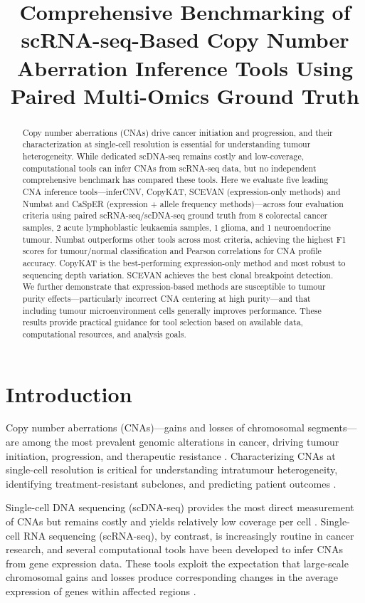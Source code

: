 \documentclass[11pt]{article}
\title{Comprehensive Benchmarking of scRNA-seq-Based Copy Number Aberration Inference Tools Using Paired Multi-Omics Ground Truth}
\author{}
\date{}
\begin{document}
\maketitle

\begin{abstract}
Copy number aberrations (CNAs) drive cancer initiation and progression, and their characterization at single-cell resolution is essential for understanding tumour heterogeneity. While dedicated scDNA-seq remains costly and low-coverage, computational tools can infer CNAs from scRNA-seq data, but no independent comprehensive benchmark has compared these tools. Here we evaluate five leading CNA inference tools---inferCNV, CopyKAT, SCEVAN (expression-only methods) and Numbat and CaSpER (expression + allele frequency methods)---across four evaluation criteria using paired scRNA-seq/scDNA-seq ground truth from 8 colorectal cancer samples, 2 acute lymphoblastic leukaemia samples, 1 glioma, and 1 neuroendocrine tumour. Numbat outperforms other tools across most criteria, achieving the highest F1 scores for tumour/normal classification and Pearson correlations for CNA profile accuracy. CopyKAT is the best-performing expression-only method and most robust to sequencing depth variation. SCEVAN achieves the best clonal breakpoint detection. We further demonstrate that expression-based methods are susceptible to tumour purity effects---particularly incorrect CNA centering at high purity---and that including tumour microenvironment cells generally improves performance. These results provide practical guidance for tool selection based on available data, computational resources, and analysis goals.
\end{abstract}

\section{Introduction}

Copy number aberrations (CNAs)---gains and losses of chromosomal segments---are among the most prevalent genomic alterations in cancer, driving tumour initiation, progression, and therapeutic resistance \citep{beroukhim2010landscape,zack2013pan}. Characterizing CNAs at single-cell resolution is critical for understanding intratumour heterogeneity, identifying treatment-resistant subclones, and predicting patient outcomes \citep{navin2011tumour}.

Single-cell DNA sequencing (scDNA-seq) provides the most direct measurement of CNAs but remains costly and yields relatively low coverage per cell \citep{gawad2016single}. Single-cell RNA sequencing (scRNA-seq), by contrast, is increasingly routine in cancer research, and several computational tools have been developed to infer CNAs from gene expression data. These tools exploit the expectation that large-scale chromosomal gains and losses produce corresponding changes in the average expression of genes within affected regions \citep{patel2014single}.
\end{document}
